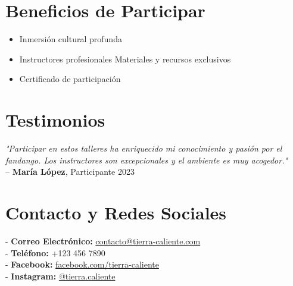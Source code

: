 \documentclass[a4paper,12pt]{article}
\begin{document}
\section*{Beneficios de Participar}
\begin{itemize}
    \item \textbullet{} Inmersión cultural profunda
    \item \textbullet{} Instructores profesionales
    \textbullet{} Materiales y recursos exclusivos
    \item \textbullet{} Certificado de participación
\end{itemize}

\section*{Testimonios}
\textit{"Participar en estos talleres ha enriquecido mi conocimiento y pasión por el fandango. Los instructores son excepcionales y el ambiente es muy acogedor."} \\
-- \textbf{María López}, Participante 2023

\section*{Contacto y Redes Sociales}
- \textbf{Correo Electrónico:} \href{mailto:contacto@tierra-caliente.com}{contacto@tierra-caliente.com} \\
- \textbf{Teléfono:} +123 456 7890 \\
- \textbf{Facebook:} \href{https://facebook.com/tierra-caliente}{facebook.com/tierra-caliente} \\
- \textbf{Instagram:} \href{https://instagram.com/tierra.caliente}{@tierra.caliente}
\end{document}
